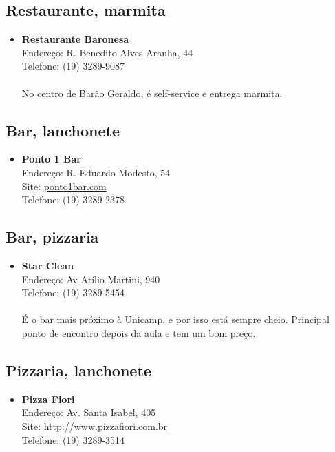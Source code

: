 \subsection{Restaurante, marmita}

\begin{itemize}
\item \textbf{Restaurante Baronesa}
  \\Endereço: R. Benedito Alves Aranha, 44
  \\Telefone: (19) 3289-9087
  \\
  \\No centro de Barão Geraldo, é self-service e entrega marmita.
\end{itemize}

\subsection{Bar, lanchonete}

\begin{itemize}
\item \textbf{Ponto 1 Bar}
  \\Endereço: R. Eduardo Modesto, 54
  \\Site: \url{ponto1bar.com}
  \\Telefone: (19) 3289-2378
\end{itemize}

\subsection{Bar, pizzaria}

\begin{itemize}
\item \textbf{Star Clean}
  \\Endereço: Av Atílio Martini, 940
  \\Telefone: (19) 3289-5454
  \\
  \\É o bar mais próximo à Unicamp, e por isso está sempre cheio. Principal
  ponto de encontro depois da aula e tem um bom preço.
\end{itemize}

\subsection{Pizzaria, lanchonete}

\begin{itemize}
\item \textbf{Pizza Fiori}
  \\Endereço: Av. Santa Isabel, 405
  \\Site: \url{http://www.pizzafiori.com.br}
  \\Telefone: (19) 3289-3514
\end{itemize}

